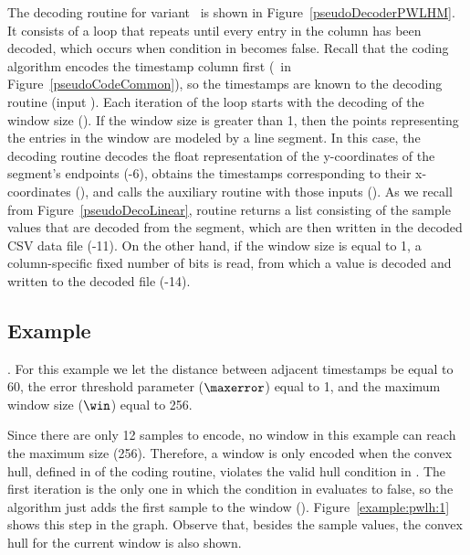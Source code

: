 


\clearpage


The decoding routine for variant \maskalgo\ is shown in Figure~\ref{pseudoDecoderPWLHM}. It consists of a loop that repeats until every entry in the column has been decoded, which occurs when condition in  becomes false. Recall that the coding algorithm encodes the timestamp column first (\Line \gapLine\ in Figure~\ref{pseudoCodeCommon}), so the timestamps are known to the decoding routine (input \tscol). Each iteration of the loop starts with the decoding of the window size (). If the window size is greater than 1, then the points representing the entries in the window are modeled by a line segment. In this case, the decoding routine decodes the float representation of the y-coordinates of the segment's endpoints (-6), obtains the timestamps corresponding to their x-coordinates (), and calls the auxiliary routine \decodeSegment with those inputs (). As we recall from Figure~\ref{pseudoDecoLinear}, routine \decodeSegment returns a list consisting of the sample values that are decoded from the segment, which are then written in the decoded CSV data file (-11). On the other hand, if the window size is equal to 1, a column-specific fixed number of bits is read, from which a value is decoded and written to the decoded file (-14).







\clearpage


\subsection{Example}
\label{algo:pwlh:example}
\newcommand{\exampleIntro}[1]{\exampleIntroFirst{#1}. For this example we let the distance between adjacent timestamps be equal to 60, the error threshold parameter ($\maxerror$) equal to 1, and the maximum window size ($\win$) equal to 256.}


\exampleIntro{\ref{example:pwlh:1}}


Since there are only 12 samples to encode, no window in this example can reach the maximum size (256). Therefore, a window is only encoded when the convex hull, defined in  of the coding routine, violates the valid hull condition in . The first iteration is the only one in which the condition in  evaluates to false, so the algorithm just adds the first sample to the window (). Figure~\ref{example:pwlh:1} shows this step in the graph. Observe that, besides the sample values, the convex hull for the current window is also shown.


